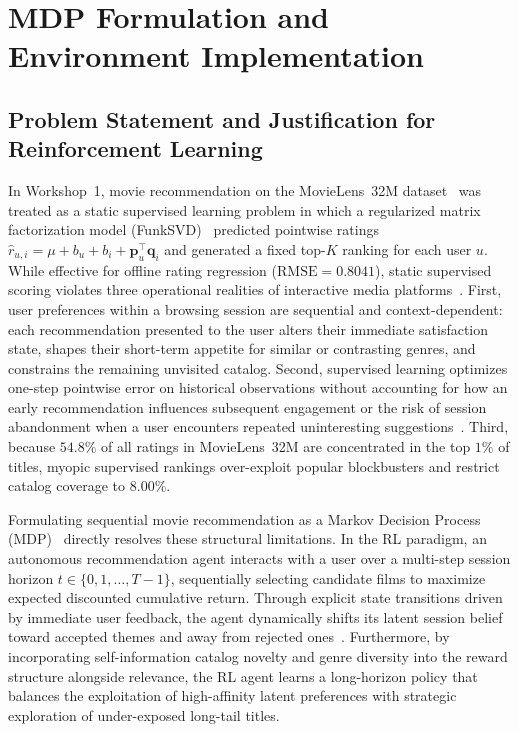 \section{MDP Formulation and Environment Implementation}
\label{sec:mdp}

\subsection{Problem Statement and Justification for Reinforcement Learning}
\label{subsec:mdp_justification}

In Workshop~1, movie recommendation on the MovieLens~32M dataset~\cite{harper2015movielens} was treated as a static supervised learning problem in which a regularized matrix factorization model (FunkSVD)~\cite{koren2009matrix} predicted pointwise ratings $\hat{r}_{u,i} = \mu + b_u + b_i + \mathbf{p}_u^\top \mathbf{q}_i$ and generated a fixed top-$K$ ranking for each user $u$. While effective for offline rating regression ($\text{RMSE} = 0.8041$), static supervised scoring violates three operational realities of interactive media platforms~\cite{afsar2022reinforcement}. First, user preferences within a browsing session are sequential and context-dependent: each recommendation presented to the user alters their immediate satisfaction state, shapes their short-term appetite for similar or contrasting genres, and constrains the remaining unvisited catalog. Second, supervised learning optimizes one-step pointwise error on historical observations without accounting for how an early recommendation influences subsequent engagement or the risk of session abandonment when a user encounters repeated uninteresting suggestions~\cite{zhao2018recommendations}. Third, because $54.8\%$ of all ratings in MovieLens~32M are concentrated in the top $1\%$ of titles, myopic supervised rankings over-exploit popular blockbusters and restrict catalog coverage to $8.00\%$.

Formulating sequential movie recommendation as a Markov Decision Process (MDP)~\cite{sutton2018reinforcement} directly resolves these structural limitations. In the RL paradigm, an autonomous recommendation agent interacts with a user over a multi-step session horizon $t \in \{0, 1, \dots, T-1\}$, sequentially selecting candidate films to maximize expected discounted cumulative return. Through explicit state transitions driven by immediate user feedback, the agent dynamically shifts its latent session belief toward accepted themes and away from rejected ones~\cite{zhao2018recommendations}. Furthermore, by incorporating self-information catalog novelty and genre diversity into the reward structure alongside relevance, the RL agent learns a long-horizon policy that balances the exploitation of high-affinity latent preferences with strategic exploration of under-exposed long-tail titles.

